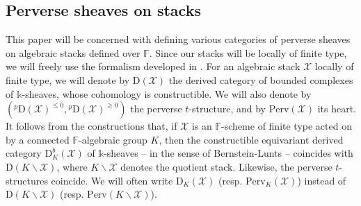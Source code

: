 \documentclass[11pt]{amsart}
\theoremstyle{plain}
\theoremstyle{remark}
\numberwithin{equation}{section}
\begin{document}
	\subsection{Perverse sheaves on stacks}\label{section Perverse sheaves on stacks}
	This paper will be concerned with defining various categories of perverse sheaves on algebraic stacks defined over $\mathbb{F}$. Since our stacks will be locally of finite type, we will freely use the formalism developed in \cite{LO}. For an algebraic stack $\mathcal{X}$ locally of finite type, we will denote by $\mathrm{D}(\mathcal{X})$ the derived category of bounded complexes of $\mathbb{k}$-sheaves, whose cohomology is constructible. We will also denote by $({^p\mathrm{D}(\mathcal{X})}^{\leq 0},{^p\mathrm{D}(\mathcal{X})}^{\geq 0} )$ the perverse $t$-structure, and by $\mathrm{Perv}(\mathcal{X})$ its heart. It follows from the constructions that, if $\mathcal{X}$ is an $\mathbb{F}$-scheme of finite type acted on by a connected $\mathbb{F}$-algebraic group $K$, then the constructible equivariant derived category $\mathrm{D}^b_K(\mathcal{X})$ of $\mathbb{k}$-sheaves -- in the sense of Bernstein-Lunts \cite{MR1299527}-- coincides with $\mathrm{D}(K\backslash\mathcal{X})$, where $K\backslash\mathcal{X}$ denotes the quotient stack. Likewise, the perverse $t$-structures coincide. We will often write  $\mathrm{D}_K(\mathcal{X})$ (resp. $\mathrm{Perv}_K(\mathcal{X})$) instead of $\mathrm{D}(K\backslash\mathcal{X})$ (resp. $\mathrm{Perv}(K\backslash\mathcal{X})$).
	
\end{document}
